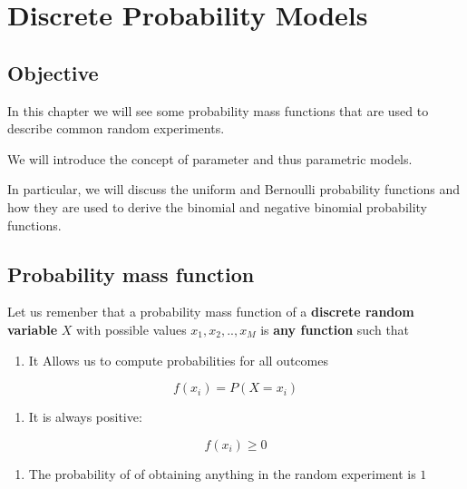 \documentclass[
]{book}
\providecommand{\tightlist}{%
  \setlength{\itemsep}{0pt}\setlength{\parskip}{0pt}}
\begin{document}
\hypertarget{discrete-probability-models}{%
\chapter{Discrete Probability Models}\label{discrete-probability-models}}

\hypertarget{objective-2}{%
\section{Objective}\label{objective-2}}

In this chapter we will see some probability mass functions that are used to describe common random experiments.

We will introduce the concept of parameter and thus parametric models.

In particular, we will discuss the uniform and Bernoulli probability functions and how they are used to derive the binomial and negative binomial probability functions.

\hypertarget{probability-mass-function}{%
\section{Probability mass function}\label{probability-mass-function}}

Let us remenber that a probability mass function of a \textbf{discrete random variable} \(X\) with possible values \(x_1 , x_2 , .. , x_M\) is \textbf{any function} such that

\begin{enumerate}
\def\labelenumi{\arabic{enumi})}
\tightlist
\item
  It Allows us to compute probabilities for all outcomes
\end{enumerate}

\[f(x_i)=P(X=x_i)\]

\begin{enumerate}
\def\labelenumi{\arabic{enumi})}
\setcounter{enumi}{1}
\tightlist
\item
  It is always positive:
\end{enumerate}

\[f(x_i)\geq 0\]

\begin{enumerate}
\def\labelenumi{\arabic{enumi})}
\setcounter{enumi}{2}
\tightlist
\item
  The probability of of obtaining anything in the random experiment is \(1\)
\end{enumerate}
\end{document}
